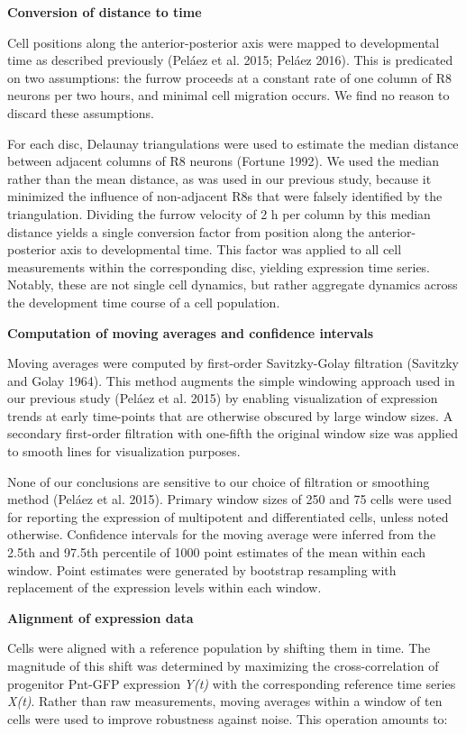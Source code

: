 \textbf{Conversion of distance to time}

Cell positions along the anterior-posterior axis were mapped to developmental time as described previously (Peláez et al. 2015; Peláez 2016). This is predicated on two assumptions: the furrow proceeds at a constant rate of one column of R8 neurons per two hours, and minimal cell migration occurs. We find no reason to discard these assumptions.

For each disc, Delaunay triangulations were used to estimate the median distance between adjacent columns of R8 neurons (Fortune 1992). We used the median rather than the mean distance, as was used in our previous study, because it minimized the influence of non-adjacent R8s that were falsely identified by the triangulation. Dividing the furrow velocity of 2 h per column by this median distance yields a single conversion factor from position along the anterior-posterior axis to developmental time. This factor was applied to all cell measurements within the corresponding disc, yielding expression time series. Notably, these are not single cell dynamics, but rather aggregate dynamics across the development time course of a cell population.

\textbf{Computation of moving averages and confidence intervals}

Moving averages were computed by first-order Savitzky-Golay filtration (Savitzky and Golay 1964). This method augments the simple windowing approach used in our previous study (Peláez et al. 2015) by enabling visualization of expression trends at early time-points that are otherwise obscured by large window sizes. A secondary first-order filtration with one-fifth the original window size was applied to smooth lines for visualization purposes.

None of our conclusions are sensitive to our choice of filtration or smoothing method (Peláez et al. 2015). Primary window sizes of 250 and 75 cells were used for reporting the expression of multipotent and differentiated cells, unless noted otherwise. Confidence intervals for the moving average were inferred from the 2.5th and 97.5th percentile of 1000 point estimates of the mean within each window. Point estimates were generated by bootstrap resampling with replacement of the expression levels within each window.

\textbf{Alignment of expression data}

Cells were aligned with a reference population by shifting them in time. The magnitude of this shift was determined by maximizing the cross-correlation of progenitor Pnt-GFP expression \emph{Y(t)} with the corresponding reference time series \emph{X(t)}. Rather than raw measurements, moving averages within a window of ten cells were used to improve robustness against noise. This operation amounts to:

